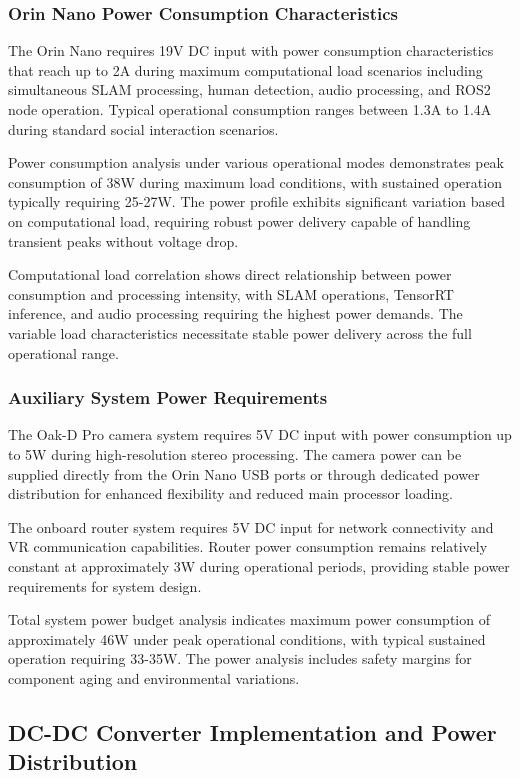 \subsubsection{Orin Nano Power Consumption Characteristics}

The Orin Nano requires 19V DC input with power consumption characteristics that reach up to 2A during maximum computational load scenarios including simultaneous SLAM processing, human detection, audio processing, and ROS2 node operation. Typical operational consumption ranges between 1.3A to 1.4A during standard social interaction scenarios.

Power consumption analysis under various operational modes demonstrates peak consumption of 38W during maximum load conditions, with sustained operation typically requiring 25-27W. The power profile exhibits significant variation based on computational load, requiring robust power delivery capable of handling transient peaks without voltage drop.

Computational load correlation shows direct relationship between power consumption and processing intensity, with SLAM operations, TensorRT inference, and audio processing requiring the highest power demands. The variable load characteristics necessitate stable power delivery across the full operational range.

\subsubsection{Auxiliary System Power Requirements}

The Oak-D Pro camera system requires 5V DC input with power consumption up to 5W during high-resolution stereo processing. The camera power can be supplied directly from the Orin Nano USB ports or through dedicated power distribution for enhanced flexibility and reduced main processor loading.

The onboard router system requires 5V DC input for network connectivity and VR communication capabilities. Router power consumption remains relatively constant at approximately 3W during operational periods, providing stable power requirements for system design.

Total system power budget analysis indicates maximum power consumption of approximately 46W under peak operational conditions, with typical sustained operation requiring 33-35W. The power analysis includes safety margins for component aging and environmental variations.

\subsection{DC-DC Converter Implementation and Power Distribution}

